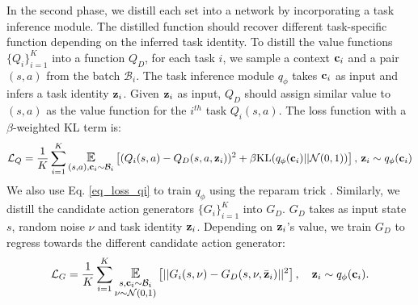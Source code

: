 In the second phase, we distill each set into a network by incorporating a task inference module. The distilled function should recover different task-specific function depending on the inferred task identity. To distill the value functions $\{Q_i\}^K_{i=1}$ into a function $Q_D$, for each task $i$, we sample a context ${\bf c}_{i}$ and a pair $(s, a)$ from the batch $\mathcal{B}_i$. The task inference module $q_\phi$ takes ${\bf c}_{i}$ as input and infers a task identity ${\bf z}_i$. Given ${\bf z}_i$ as input, $Q_D$ should assign similar value to $(s, a)$ as the value function for the $i^{th}$ task $Q_i(s, a)$. The loss function with a $\beta$-weighted KL term \cite{rakelly2019efficient} is:
\begin{equation}\label{eq_loss_qi}
    \mathcal{L}_Q = \frac{1}{K} \sum_{i=1}^{K} \mathlarger{\underset{\substack{(s, a),  {\bf c}_{i} \sim  \mathcal{B}_i }}{\mathbb{E}} }\left[( Q_i(s, a) - Q_D(s, a, {\bf z}_i) )^2 + \beta\text{KL}(q_\phi({\bf c}_i) ||  \mathcal{N}(0,1))\right], \, {\bf z}_i \sim q_\phi({\bf c}_{i})
\end{equation}
We also use Eq. \ref{eq_loss_qi} to train $q_\phi$ using the reparam trick \cite{kingma2013auto}. Similarly, we distill the candidate action generators $\{G_i\}^K_{i=1}$ into $G_D$. $G_D$ takes as input state $s$, random noise $\nu$ and task identity ${\bf z}_i$. Depending on ${\bf z}_i$'s value, we train $G_D$ to regress towards the different candidate action generator:
\begin{equation}\label{eq_loss_gi}
    \mathcal{L}_G = \frac{1}{K} \sum_{i=1}^{K} \mathlarger{\underset{\substack{s, {\bf c}_{i} \sim \mathcal{B}_i \\ \nu \sim \mathcal{N}(0,1) }}{\mathbb{E}} } \left[ || G_i(s, \nu) - G_D(s, \nu, \bar{\bf z}_i) || ^ 2 \right], \quad {\bf z}_i \sim q_\phi({\bf c}_{i}).
\end{equation}

